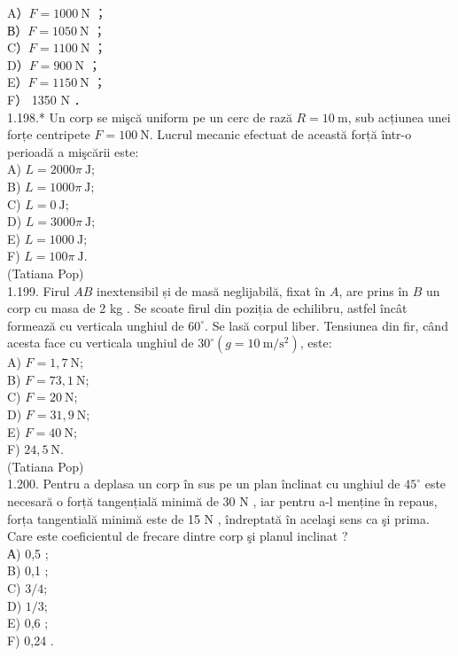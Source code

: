 \documentclass[10pt]{article}
\begin{document}
A）$F=1000 \mathrm{~N}$ ；\\
В）$F=1050 \mathrm{~N}$ ；\\
C）$F=1100 \mathrm{~N}$ ；\\
D）$F=900 \mathrm{~N}$ ；\\
E）$F=1150 \mathrm{~N}$ ；\\
F） 1350 N ．\\
1.198.* Un corp se mişcă uniform pe un cerc de rază $R=10 \mathrm{~m}$, sub acțiunea unei forțe centripete $F=100 \mathrm{~N}$. Lucrul mecanic efectuat de această forță într-o perioadă a mişcării este:\\
A) $L=2000 \pi \mathrm{~J}$;\\
B) $L=1000 \pi \mathrm{~J}$;\\
C) $L=0 \mathrm{~J}$;\\
D) $L=3000 \pi \mathrm{~J}$;\\
E) $L=1000 \mathrm{~J}$;\\
F) $L=100 \pi \mathrm{~J}$.\\
(Tatiana Pop)\\
1.199. Firul $A B$ inextensibil și de masă neglijabilă, fixat în $A$, are prins în $B$ un corp cu masa de 2 kg . Se scoate firul din poziția de echilibru, astfel încât formează cu verticala unghiul de $60^{\circ}$. Se lasă corpul liber. Tensiunea din fir, când acesta face cu verticala unghiul de $30^{\circ}\left(g=10 \mathrm{~m} / \mathrm{s}^{2}\right)$, este:\\
A) $F=1,7 \mathrm{~N}$;\\
B) $F=73,1 \mathrm{~N}$;\\
C) $F=20 \mathrm{~N}$;\\
D) $F=31,9 \mathrm{~N}$;\\
E) $F=40 \mathrm{~N}$;\\
F) $24,5 \mathrm{~N}$.\\
(Tatiana Pop)\\
1.200. Pentru a deplasa un corp în sus pe un plan înclinat cu unghiul de $45^{\circ}$ este necesară o forță tangențială minimă de 30 N , iar pentru a-l menține în repaus, forța tangentială minimă este de 15 N , îndreptată în acelaşi sens ca şi prima. Care este coeficientul de frecare dintre corp şi planul inclinat ?\\
А) 0,5 ;\\
B) 0,1 ;\\
C) $3 / 4$;\\
D) $1 / 3$;\\
E) 0,6 ;\\
F) 0,24 .\\
\end{document}
